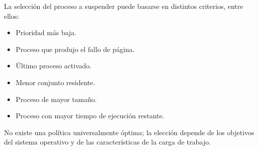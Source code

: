 La selección del proceso a suspender puede basarse en distintos criterios, entre ellos:
\begin{itemize}
  \item Prioridad más baja.
  \item Proceso que produjo el fallo de página.
  \item Último proceso activado.
  \item Menor conjunto residente.
  \item Proceso de mayor tamaño.
  \item Proceso con mayor tiempo de ejecución restante.
\end{itemize}

No existe una política universalmente óptima; la elección depende de los objetivos del sistema operativo y de las características de la carga de trabajo.
